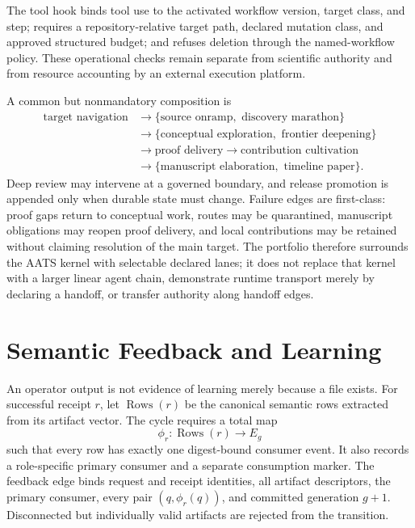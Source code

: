 \documentclass[11pt]{article}
\begin{document}
The tool hook binds tool use to the activated workflow version, target class, and step; requires a repository-relative target path, declared mutation class, and approved structured budget; and refuses deletion through the named-workflow policy. These operational checks remain separate from scientific authority and from resource accounting by an external execution platform.

A common but nonmandatory composition is
\[
\begin{split}
\text{target navigation}
&\rightarrow\{\text{source onramp},\text{ discovery marathon}\}\\
&\rightarrow\{\text{conceptual exploration},\text{ frontier deepening}\}\\
&\rightarrow\text{proof delivery}\rightarrow\text{contribution cultivation}\\
&\rightarrow\{\text{manuscript elaboration},\text{ timeline paper}\}.
\end{split}
\]
Deep review may intervene at a governed boundary, and release promotion is appended only when durable state must change. Failure edges are first-class: proof gaps return to conceptual work, routes may be quarantined, manuscript obligations may reopen proof delivery, and local contributions may be retained without claiming resolution of the main target. The portfolio therefore surrounds the AATS kernel with selectable declared lanes; it does not replace that kernel with a larger linear agent chain, demonstrate runtime transport merely by declaring a handoff, or transfer authority along handoff edges.

\section{Semantic Feedback and Learning}

An operator output is not evidence of learning merely because a file exists. For successful receipt $r$, let $\operatorname{Rows}(r)$ be the canonical semantic rows extracted from its artifact vector. The cycle requires a total map
\[
  \phi_r:\operatorname{Rows}(r)\rightarrow E_g
\]
such that every row has exactly one digest-bound consumer event. It also records a role-specific primary consumer and a separate consumption marker. The feedback edge binds request and receipt identities, all artifact descriptors, the primary consumer, every pair $(q,\phi_r(q))$, and committed generation $g+1$. Disconnected but individually valid artifacts are rejected from the transition.
\end{document}
